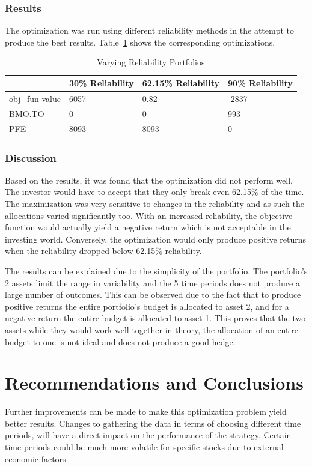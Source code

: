 \documentclass[12pt]{article}
\begin{document}
\subsubsection{Results}
The optimization was run using different reliability methods in the attempt to produce the best results. Table~\ref{tab:result_cc} shows the corresponding optimizations. 

\begin{table}[H]
\centering
\begin{tabular}{|l|l|l|l|}
\hline
	~ & \textbf{30\% Reliability} & \textbf{62.15\% Reliability} & \textbf{90\% Reliability} \\ \hline
	obj\_fun value & 6057 & 0.82 & -2837 \\ \hline
	BMO.TO & 0 & 0 & 993 \\ \hline
	PFE & 8093 & 8093 & 0\\ \hline
\end{tabular}
\caption {Varying Reliability Portfolios}
\label{tab:result_cc}
\end{table}

\subsubsection{Discussion}

Based on the results, it was found that the optimization did not perform well. The investor would have to accept that they only break even 62.15\% of the time. The maximization was very sensitive to changes in the reliability and as such the allocations varied significantly too. With an increased reliability, the objective function would actually yield a negative return which is not acceptable in the investing world. Conversely, the optimization would only produce positive returns when the reliability dropped below 62.15\% reliability. 

	The results can be explained due to the simplicity of the portfolio. The portfolio’s 2 assets limit the range in variability and the 5 time periods does not produce a large number of outcomes. This can be observed due to the fact that to produce positive returns the entire portfolio’s budget is allocated to asset 2, and for a negative return the entire budget is allocated to asset 1. This proves that the two assets while they would work well together in theory, the allocation of an entire budget to one is not ideal and does not produce a good hedge. 


\section{Recommendations and Conclusions}
Further improvements can be made to make this optimization problem yield better results. Changes to gathering the data in terms of choosing different time periods, will have a direct impact on the performance of the strategy. Certain time periods could be much more volatile for specific stocks due to external economic factors. 
\end{document}
